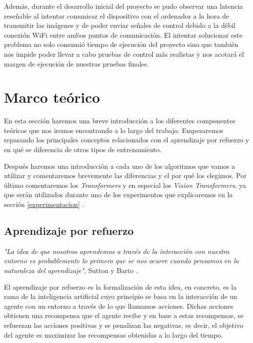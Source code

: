 Además, durante el desarrollo inicial del proyecto se pudo observar una latencia reseñable al intentar comunicar el dispositivo con el ordenador a la hora de transmitir las imágenes y de poder enviar señales de control debido a la débil conexión WiFi entre ambos puntos de comunicación. El intentar solucionar este problema no solo consumió tiempo de ejecución del proyecto sino que también nos impide poder llevar a cabo pruebas de control más realistas y nos acotará el margen de ejecución de nuestras pruebas finales.
\medskip

\section{Marco teórico}

En esta sección haremos una breve introducción a los diferentes componentes teóricos que nos iremos encontrando a lo largo del trabajo. Empezaremos repasando los principales conceptos relacionados con el aprendizaje por refuerzo y en qué se diferencia de otros tipos de entrenamiento. 
\medskip

Después haremos una introducción a cada uno de los algoritmos que vamos a utilizar y comentaremos brevemente las diferencias y el por qué los elegimos.
Por último comentaremos los \textit{Transformers}\citep{transformers} y en especial los \textit{Vision Transformers}\citep{visiontransformers}, ya que serán utilizados durante uno de los experimentos que explicaremos en la sección \ref{experimentacion} .
\medskip

\subsection{Aprendizaje por refuerzo}
\label{aprendizaje-por-refuerzo}

\textit{"La idea de que nosotros aprendemos a través de la interacción con nuestro entorno es probablemente lo primero que se nos ocurre cuando pensamos en la naturaleza del aprendizaje"}, Sutton y Barto \citep{sutton2018reinforcement}.
\medskip

El aprendizaje por refuerzo es la formalización de esta idea, en concreto, es la rama de la inteligencia artificial cuyo principio se basa en la interacción de un agente con un entorno a través de lo que llamamos acciones. Dichas acciones obtienen una recompensa que el agente recibe y en base a estas recompensas, se refuerzan las acciones positivas y se penalizan las negativas, es decir, el objetivo del agente es maximizar las recompensas obtenidas a lo largo del tiempo.
\medskip

